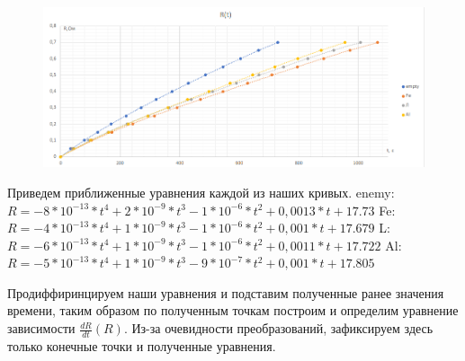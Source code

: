 \documentclass[12pt,a4paper]{article}
\begin{document}
\begin{figure}[H]
	\begin{center}
		\includegraphics[width=14cm]{2.1.4_gr_1}
	\end{center}
\end{figure}

Приведем приближенные уравнения каждой из наших кривых.\hfill \break
enemy: $R = -8*10^{-13}*t^4 + 2*10^{-9}*t^3 - 1*10^{-6}*t^2 + 0,0013*t + 17.73$ \hfill \break
Fe: $R = -4*10^{-13}*t^4 + 1*10^{-9}*t^3 - 1*10^{-6}*t^2 + 0,001*t + 17.679$ \hfill \break
L: $R = -6*10^{-13}*t^4 + 1*10^{-9}*t^3 - 1*10^{-6}*t^2 + 0,0011*t + 17.722$ \hfill \break
Al: $R = -5*10^{-13}*t^4 + 1*10^{-9}*t^3 - 9*10^{-7}*t^2 + 0,001*t + 17.805$

Продиффиринцируем наши уравнения и подставим полученные ранее значения времени, таким образом по полученным точкам построим и определим уравнение зависимости $\frac{dR}{dt}(R)$. Из-за очевидности преобразований, зафиксируем здесь только конечные точки и полученные уравнения.
\end{document}
